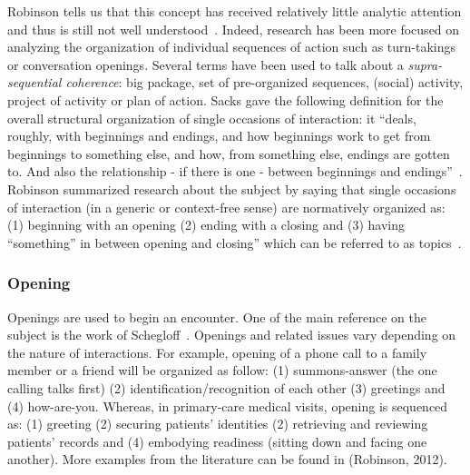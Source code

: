 \documentclass[a4paper,11pt,twoside]{StyleThese}
\begin{document}
Robinson tells us that this concept has received relatively little analytic attention and thus is still not well understood~\cite{robinson_overall_2012}. Indeed, research has been more focused on analyzing the organization of individual sequences of action such as turn-takings or conversation openings. Several terms have been used to talk about a \emph{supra-sequential coherence}: big package, set of pre-organized sequences, (social) activity, project of activity or plan of action. Sacks gave the following definition for the overall structural organization of single occasions of interaction: it ``deals, roughly, with beginnings and endings, and how beginnings work to get from beginnings to something else, and how, from something else, endings are gotten to. And also the relationship - if there is one - between beginnings and endings''~\cite[p.~157]{sacks_lectures_1995}. Robinson summarized research about the subject by saying that single occasions of interaction (in a generic or context-free sense) are normatively organized as: (1) beginning with an opening (2) ending with a closing and (3) having ``something'' in between opening and closing'' which can be referred to as topics~\cite{robinson_overall_2012}.

\subsubsection{Opening}
Openings are used to begin an encounter. One of the main reference on the subject is the work of Schegloff~\cite{schegloff_1986_routine}. Openings and related issues vary depending on the nature of interactions. For example, opening of a phone call to a family member or a friend will be organized as follow: (1) summons-answer (the one calling talks first) (2) identification/recognition of each other (3) greetings and (4) how-are-you. Whereas, in primary-care medical visits, opening is sequenced as: (1) greeting (2) securing patients’ identities (2) retrieving and reviewing patients’ records and (4) embodying readiness (sitting down and facing one another). More examples from the literature can be found in (Robinson, 2012). 
\end{document}
